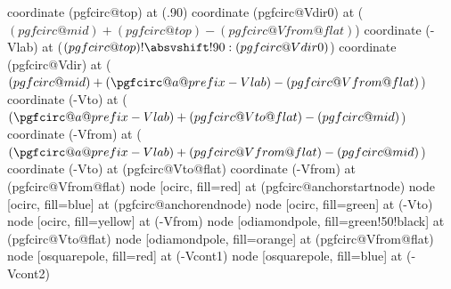{            coordinate (pgfcirc@top) at (.90)
            coordinate (pgfcirc@Vdir0) at ($(pgfcirc@mid)+(pgfcirc@top)-(pgfcirc@Vfrom@flat)$)
            coordinate (\pgfcirc@a@prefix-Vlab) at ($(pgfcirc@top) !  \absvshift!90 : (pgfcirc@Vdir0)$)
            coordinate (pgfcirc@Vdir) at ($(pgfcirc@mid)+(\pgfcirc@a@prefix-Vlab)-(pgfcirc@Vfrom@flat)$)
            \ifpgf@circuit@bipole@voltage@raised
                coordinate (\pgfcirc@a@prefix-Vto) at ($(\pgfcirc@a@prefix-Vlab)+(pgfcirc@Vto@flat)-(pgfcirc@mid)$)
                coordinate (\pgfcirc@a@prefix-Vfrom) at ($(\pgfcirc@a@prefix-Vlab)+(pgfcirc@Vfrom@flat)-(pgfcirc@mid)$)
            \fi
        \fi
    \fi
    \ifx\@@kind\@@open
        coordinate (\pgfcirc@a@prefix-Vto) at (pgfcirc@Vto@flat)
        coordinate (\pgfcirc@a@prefix-Vfrom) at (pgfcirc@Vfrom@flat)
    \fi
    \ifpgf@circ@debugv
        node [ocirc, fill=red] at (pgfcirc@anchorstartnode) {}
        node [ocirc, fill=blue] at (pgfcirc@anchorendnode) {}
        node [ocirc, fill=green] at (\pgfcirc@a@prefix-Vto) {}
        node [ocirc, fill=yellow] at (\pgfcirc@a@prefix-Vfrom) {}
        node [odiamondpole, fill=green!50!black] at (pgfcirc@Vto@flat) {}
        node [odiamondpole, fill=orange] at (pgfcirc@Vfrom@flat) {}
        \ifpgf@circuit@europeanvoltage
            \ifpgf@circuit@bipole@voltage@straight
            \else
                node [osquarepole, fill=red] at (\pgfcirc@a@prefix-Vcont1) {}
                node [osquarepole, fill=blue] at (\pgfcirc@a@prefix-Vcont2) {}
            \fi
        \fi
    \fi

}
